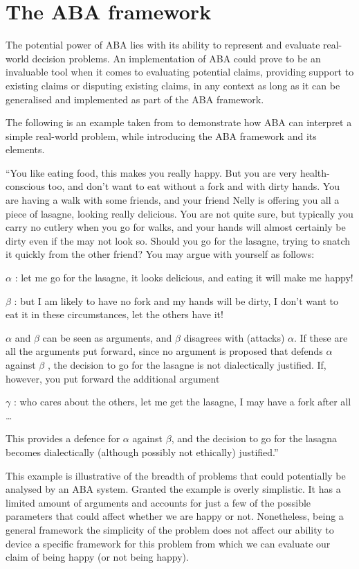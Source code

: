 \section{The ABA framework}
The potential power of ABA lies with its ability to represent and evaluate real-world decision problems. An implementation of ABA could prove to be an invaluable tool when it comes to evaluating potential claims, providing support to existing claims or disputing existing claims, in any context as long as it can be generalised and implemented as part of the ABA framework.

The following is an example taken from \cite{abatut} to demonstrate how ABA can interpret a simple real-world problem, while introducing the ABA framework and its elements.

``You like eating food, this makes you really happy. But you are very health-conscious too, and don't want to eat without a fork and with dirty hands. You are having a walk with some friends, and your friend Nelly is offering you all a piece of lasagne, looking really delicious. You are not quite sure, but typically you carry no cutlery when you go for walks, and your hands will almost certainly be dirty even if the may not look so. Should you go for the lasagne, trying to snatch it quickly from the other friend? You may argue with yourself as follows:

\ensuremath{\alpha} : let me go for the lasagne, it looks delicious, and eating it will make me happy!

\ensuremath{\beta} : but I am likely to have no fork and my hands will be dirty, I don't want to eat it in these circumstances, let the others have it!

\ensuremath{\alpha} and \ensuremath{\beta} can be seen as arguments, and \ensuremath{\beta} disagrees with (attacks) \ensuremath{\alpha}. If these are all the arguments put forward, since no argument is proposed that defends \ensuremath{\alpha} against \ensuremath{\beta} , the decision to go for the lasagne is not dialectically justified. If, however, you put forward the additional argument

\ensuremath{\gamma} : who cares about the others, let me get the lasagne, I may have a fork after all …

This provides a defence for \ensuremath{\alpha} against \ensuremath{\beta}, and the decision to go for the lasagna becomes dialectically (although possibly not ethically) justified.''

This example is illustrative of the breadth of problems that could potentially be analysed by an ABA system. Granted the example is overly simplistic. It has a limited amount of arguments and accounts for just a few of the possible parameters that could affect whether we are happy or not. Nonetheless, being a general framework the simplicity of the problem does not affect our ability to device a specific framework for this problem from which we can evaluate our claim of being happy (or not being happy). 

